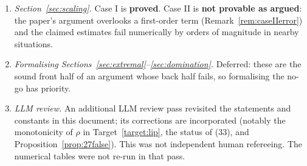 \begin{enumerate}
type 1 construction (Section~\ref{sec:type2}, Gap~\ref{gap:type2}).
\item \emph{Section~\ref{sec:scaling}.} Case I is \textbf{proved}. Case II is
\textbf{not provable as argued}: the paper's argument overlooks a first-order term
(Remark~\ref{rem:caseIIerror}) and the claimed estimates fail numerically by orders of
magnitude in nearby situations.
\item \emph{Formalising Sections~\ref{sec:extremal}--\ref{sec:domination}.} Deferred: these
are the sound front half of an argument whose back half fails, so formalising the no-go has
priority.
\item \emph{LLM review.} An additional LLM review pass revisited the statements and
constants in this document; its corrections are incorporated (notably the monotonicity of
$\rho$ in Target~\ref{target:lip}, the status of (33), and Proposition~\ref{prop:27false}).
This was not independent human refereeing. The numerical tables were not re-run in that pass.
\end{enumerate}
